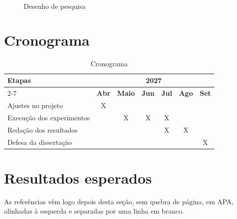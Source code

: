 \documentclass[12pt,a4paper]{article}
\begin{document}
\begin{figure}[htbp]
  \centering
  \caption{Desenho de pesquisa}
  \label{fig:exemplo}
\end{figure}

\section{Cronograma}

\begin{table}[htbp]
  \caption{Cronograma}
  \label{tab:cronograma}
  \begin{tabularx}{\textwidth}{X *{6}{c}}
    \toprule
    \multirow{2}{*}{\textbf{Etapas}} & \multicolumn{6}{c}{\textbf{2027}} \\
    \cmidrule(l){2-7}
     & \textbf{Abr} & \textbf{Maio} & \textbf{Jun} & \textbf{Jul} & \textbf{Ago} & \textbf{Set} \\
    \midrule
    Ajustes no projeto        & X &   &   &   &   &   \\
    Execução dos experimentos &   & X & X & X &   &   \\
    Redação dos resultados    &   &   &   & X & X &   \\
    Defesa da dissertação     &   &   &   &   &   & X \\
    \bottomrule
  \end{tabularx}
\end{table}

\section{Resultados esperados}

As referências vêm logo depois desta seção, sem quebra de página, em APA,
alinhadas à esquerda e separadas por uma linha em branco.

\printbibliography
\end{document}
